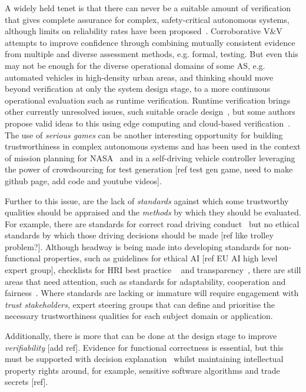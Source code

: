 A widely held tenet is that there can never be a suitable amount of verification that gives complete assurance for complex, safety-critical autonomous systems, although limits on reliability rates have been proposed~\cite{Butler1993}. Corroborative V\&V~\cite{webster2020corroborative} attempts to improve confidence through combining mutually consistent evidence from multiple and diverse assessment methods, e.g. formal, testing. 
%
But even this may not be enough for the diverse operational domains of some AS, e.g. automated vehicles in high-density urban areas, and thinking should move beyond verification at only the system design stage, to a more continuous operational evaluation such as runtime verification. Runtime verification brings other currently unresolved issues, such suitable oracle design~\cite{Leucker2009}, but some authors propose valid ideas to this using edge computing and cloud-based verification~\cite{CyRes20,eder2021cyres}. 
%
The use of \emph{serious games} can be another interesting opportunity for building trustworthiness in complex autonomous systems and has been used in the context of mission planning for NASA~\cite{Allen2018} and in a self-driving vehicle controller leveraging the power of crowdsourcing for test generation [ref test gen game, need to make github page, add code and youtube videos]. 

Further to this issue, are the lack of \emph{standards} against which some trustworthy qualities should be appraised and the \emph{methods} by which they should be evaluated. For example, there are standards for correct road driving conduct~\cite{highwayCode} but no ethical standards by which those driving decisions should be made [ref like trolley problem?]. 
%
Although headway is being made into developing standards for non-functional properties, such as guidelines for ethical AI [ref EU AI high level expert group], checklists for HRI best practice ~\cite{kraus2022trustworthy} and transparency~\cite{winfield2021ieee}, there are still areas that need attention, such as standards for adaptability, cooperation and fairness~\cite{Abeywickrama2022}. 
%
Where standards are lacking or immature will require engagement with \emph{trust stakeholders}, expert steering groups that can define and prioritise the necessary trustworthiness qualities for each subject domain or application. 

Additionally, there is more that can be done at the design stage to improve \emph{verifiability} [add ref]. Evidence for functional correctness is essential, but this must be supported with decision explanation~\cite{koopman2018toward} whilst maintaining intellectual property rights around, for example, sensitive software algorithms and trade secrets [ref]. 

